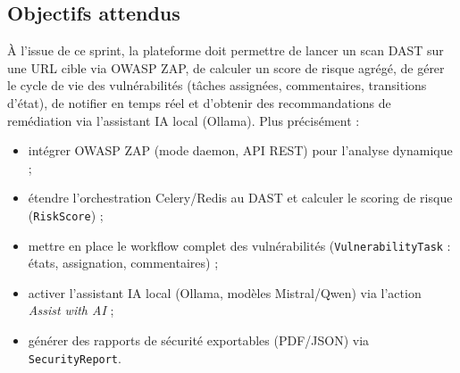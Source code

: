 \subsection{Objectifs attendus}
À l'issue de ce sprint, la plateforme doit permettre de lancer un scan DAST sur une URL cible via OWASP ZAP, de calculer un score de risque agrégé, de gérer le cycle de vie des vulnérabilités (tâches assignées, commentaires, transitions d'état), de notifier en temps réel et d'obtenir des recommandations de remédiation via l'assistant IA local (Ollama). Plus précisément :
\begin{itemize}
  \item intégrer OWASP ZAP (mode daemon, API REST) pour l'analyse dynamique ;
  \item étendre l'orchestration Celery/Redis au DAST et calculer le scoring de risque (\texttt{RiskScore}) ;
  \item mettre en place le workflow complet des vulnérabilités (\texttt{VulnerabilityTask} : états, assignation, commentaires) ;
  \item activer l'assistant IA local (Ollama, modèles Mistral/Qwen) via l'action \textit{Assist with AI} ;
  \item générer des rapports de sécurité exportables (PDF/JSON) via \texttt{SecurityReport}.
\end{itemize}

